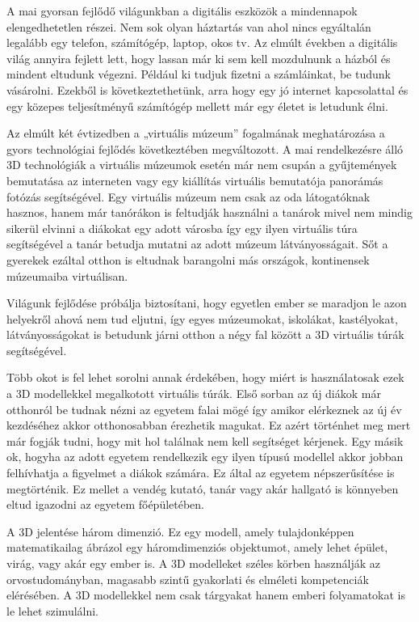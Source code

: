 A mai gyorsan fejlődő világunkban a digitális eszközök a mindennapok elengedhetetlen részei. Nem sok olyan háztartás van ahol nincs egyáltalán legalább egy telefon, számítógép, laptop, okos tv. Az elmúlt években a digitális világ annyira fejlett lett, hogy lassan már ki sem kell mozdulnunk a házból és mindent eltudunk végezni. Például ki tudjuk fizetni a számláinkat, be tudunk vásárolni. Ezekből is következtethetünk, arra hogy egy jó internet kapcsolattal és egy közepes teljesítményű számítógép mellett már egy életet is letudunk élni.

Az elmúlt két évtizedben a „virtuális múzeum” \cite{kersten2017development} fogalmának meghatározása a gyors technológiai fejlődés következtében megváltozott. A mai rendelkezésre álló 3D technológiák a virtuális múzeumok esetén már nem csupán a gyűjtemények bemutatása az interneten vagy egy kiállítás virtuális bemutatója panorámás fotózás segítségével. Egy virtuális múzeum nem csak az oda látogatóknak hasznos, hanem már tanórákon is feltudják használni a tanárok mivel nem mindig sikerül elvinni a diákokat egy adott városba így egy ilyen virtuális túra segítségével a tanár betudja mutatni az adott múzeum látványosságait. Sőt a gyerekek ezáltal otthon is eltudnak barangolni más országok, kontinensek múzeumaiba virtuálisan.

Világunk fejlődése próbálja biztosítani, hogy egyetlen ember se maradjon le azon helyekről ahová nem tud eljutni, így egyes múzeumokat, iskolákat, kastélyokat, látványosságokat is betudunk járni otthon a négy fal között a 3D virtuális túrák segítségével.

Több okot is fel lehet sorolni annak érdekében, hogy miért is használatosak ezek a 3D modellekkel megalkotott virtuális túrák. Első sorban az új diákok már otthonról be tudnak nézni az egyetem falai mögé így amikor elérkeznek az új év kezdéséhez akkor otthonosabban érezhetik magukat. Ez azért történhet meg mert már fogják tudni, hogy mit hol találnak nem kell segítséget kérjenek. Egy másik ok, hogyha az adott egyetem rendelkezik egy ilyen típusú modellel akkor jobban felhívhatja a figyelmet a diákok számára. Ez által az egyetem népszerűsítése is megtörténik. Ez mellet a vendég kutató, tanár vagy akár hallgató is könnyeben eltud igazodni az egyetem főépületében.

A 3D jelentése három dimenzió. Ez egy modell, amely tulajdonképpen matematikailag ábrázol egy háromdimenziós objektumot, amely lehet épület, virág, vagy akár egy ember is. A 3D modelleket széles körben használják az orvostudományban, magasabb szintű gyakorlati és elméleti kompetenciák elérésében. A 3D modellekkel nem csak tárgyakat hanem emberi folyamatokat is le lehet szimulálni.

